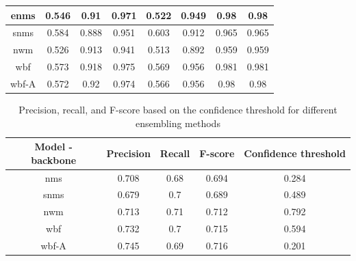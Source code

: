 \begin{table}
    \centering
    \begin{tabular}{c|c|c|c|c|c|c|c}
        enms  & 0.546 & 0.91  & 0.971 & 0.522 & 0.949 & 0.98  & 0.98  \\ \hline
        snms  & 0.584 & 0.888 & 0.951 & 0.603 & 0.912 & 0.965 & 0.965 \\ \hline
        nwm   & 0.526 & 0.913 & 0.941 & 0.513 & 0.892 & 0.959 & 0.959 \\ \hline
        wbf   & 0.573 & 0.918 & 0.975 & 0.569 & 0.956 & 0.981 & 0.981 \\ \hline
        wbf-A & 0.572 & 0.92  & 0.974 & 0.566 & 0.956 & 0.98  & 0.98  \\ \hline
    \end{tabular}
\end{table}


\begin{table}
    \begin{tabular}{c||c|c|c|c}
        Model - backbone & Precision & Recall & F-score & Confidence threshold \\ \hline \hline
        nms              & 0.708     & 0.68   & 0.694   & 0.284                \\ \hline
        snms             & 0.679     & 0.7    & 0.689   & 0.489                \\ \hline
        nwm              & 0.713     & 0.71   & 0.712   & 0.792                \\ \hline
        wbf              & 0.732     & 0.7    & 0.715   & 0.594                \\ \hline
        wbf-A            & 0.745     & 0.69   & 0.716   & 0.201                \\ \hline
    \end{tabular}
    \caption{Precision, recall, and F-score based on the confidence threshold for different ensembling methods}
    \label{tab:ensembling_prf}
\end{table}
